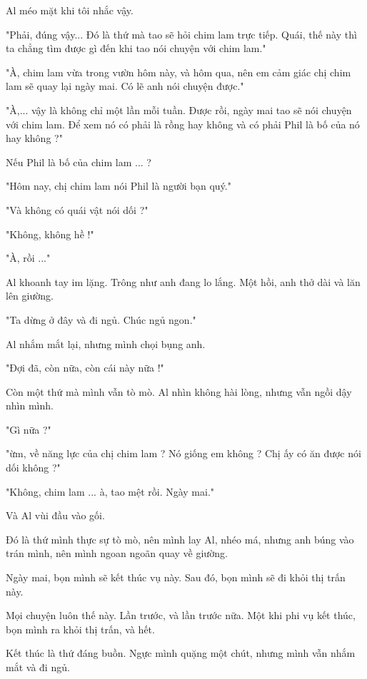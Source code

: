  Al méo mặt khi tôi nhắc vậy.
 
 "Phải, đúng vậy... Đó là thứ mà tao sẽ hỏi chim lam trực tiếp. Quái, thế này thì ta chẳng tìm được gì đến khi tao nói chuyện với chim lam."
 
 "À, chim lam vừa trong vườn hôm này, và hôm qua, nên em cảm giác chị chim lam sẽ quay lại ngày mai. Có lẽ anh nói chuyện được."
 
 "À,... vậy là không chỉ một lần mỗi tuần. Được rồi, ngày mai tao sẽ nói chuyện với chim lam. Để xem nó có phải là rồng hay không và có phải Phil là bố của nó hay không ?"
 
 Nếu Phil là bố của chim lam ... ?
 
 "Hôm nay, chị chim lam nói Phil là người bạn quý."
 
 "Và không có quái vật nói dối ?"
 
 "Không, không hề !"
 
 "À, rồi ..."
 
 Al khoanh tay im lặng. Trông như anh đang lo lắng. Một hồi, anh thở dài và lăn lên giường.
 
 "Ta dừng ở đây và đi ngủ. Chúc ngủ ngon."
 
 Al nhắm mắt lại, nhưng mình chọi bụng anh.
 
 "Đợi đã, còn nữa, còn cái này nữa !"
 
 Còn một thứ mà mình vẫn tò mò. Al nhìn không hài lòng, nhưng vẫn ngồi dậy nhìn mình.
 
 "Gì nữa ?"
 
 "ừm, về năng lực của chị chim lam ? Nó giống em không ? Chị ấy có ăn được nói dối không ?"
 
 "Không, chim lam ... à, tao mệt rồi. Ngày mai."
 
 Và Al vùi đầu vào gối.
 
 Đó là thứ mình thực sự tò mò, nên mình lay Al, nhéo má, nhưng anh búng vào trán mình, nên mình ngoan ngoãn quay về giường.
 
 Ngày mai, bọn mình sẽ kết thúc vụ này. Sau đó, bọn mình sẽ đi khỏi thị trấn này.
 
 Mọi chuyện luôn thế này. Lần trước, và lần trước nữa. Một khi phi vụ kết thúc, bọn mình ra khỏi thị trấn, và hết. 
 
 Kết thúc là thứ đáng buồn. Ngực mình quặng một chút, nhưng mình vẫn nhắm mắt và đi ngủ. \\
 
 